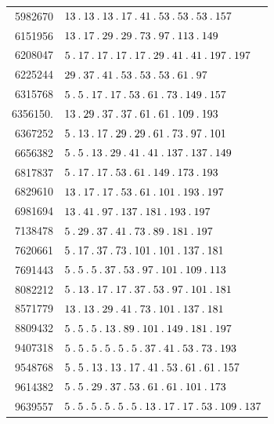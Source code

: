 %
\begingroup\small\setlength{\tabcolsep}{5pt}
\begin{longtable}{@{}r|l@{}}
5982670 & $13\pdot 13\pdot 13\pdot 17\pdot 41\pdot 53\pdot 53\pdot 53\pdot 157$\\
6151956 & $13\pdot 17\pdot 29\pdot 29\pdot 73\pdot 97\pdot 113\pdot 149$\\
6208047 & $5\pdot 17\pdot 17\pdot 17\pdot 17\pdot 29\pdot 41\pdot 41\pdot 197\pdot 197$\\
6225244 & $29\pdot 37\pdot 41\pdot 53\pdot 53\pdot 53\pdot 61\pdot 97$\\
6315768 & $5\pdot 5\pdot 17\pdot 17\pdot 53\pdot 61\pdot 73\pdot 149\pdot 157$\\
6356150. & $13\pdot 29\pdot 37\pdot 37\pdot 61\pdot 61\pdot 109\pdot 193$\\
6367252 & $5\pdot 13\pdot 17\pdot 29\pdot 29\pdot 61\pdot 73\pdot 97\pdot 101$\\
6656382 & $5\pdot 5\pdot 13\pdot 29\pdot 41\pdot 41\pdot 137\pdot 137\pdot 149$\\
6817837 & $5\pdot 17\pdot 17\pdot 53\pdot 61\pdot 149\pdot 173\pdot 193$\\
6829610 & $13\pdot 17\pdot 17\pdot 53\pdot 61\pdot 101\pdot 193\pdot 197$\\
6981694 & $13\pdot 41\pdot 97\pdot 137\pdot 181\pdot 193\pdot 197$\\
7138478 & $5\pdot 29\pdot 37\pdot 41\pdot 73\pdot 89\pdot 181\pdot 197$\\
7620661 & $5\pdot 17\pdot 37\pdot 73\pdot 101\pdot 101\pdot 137\pdot 181$\\
7691443 & $5\pdot 5\pdot 5\pdot 37\pdot 53\pdot 97\pdot 101\pdot 109\pdot 113$\\
8082212 & $5\pdot 13\pdot 17\pdot 17\pdot 37\pdot 53\pdot 97\pdot 101\pdot 181$\\
8571779 & $13\pdot 13\pdot 29\pdot 41\pdot 73\pdot 101\pdot 137\pdot 181$\\
8809432 & $5\pdot 5\pdot 5\pdot 13\pdot 89\pdot 101\pdot 149\pdot 181\pdot 197$\\
9407318 & $5\pdot 5\pdot 5\pdot 5\pdot 5\pdot 5\pdot 37\pdot 41\pdot 53\pdot 73\pdot 193$\\
9548768 & $5\pdot 5\pdot 13\pdot 13\pdot 17\pdot 41\pdot 53\pdot 61\pdot 61\pdot 157$\\
9614382 & $5\pdot 5\pdot 29\pdot 37\pdot 53\pdot 61\pdot 61\pdot 101\pdot 173$\\
9639557 & $5\pdot 5\pdot 5\pdot 5\pdot 5\pdot 5\pdot 13\pdot 17\pdot 17\pdot 53\pdot 109\pdot 137$\\

\end{longtable}

